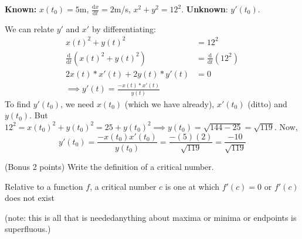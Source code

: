 \documentclass[11pt]{exam}
\renewcommand{\d}{\mathrm{d}}
\begin{document}
\begin{questions}
\textbf{Known:} $x(t_0)=5$m, $\frac{\d x}{\d t}=2$m/s, $x^2+y^2=12^2.$ \textbf{Unknown}: $y'(t_0)$.

We can relate $y'$ and $x'$ by differentiating: \begin{align*}
x(t)^2+y(t)^2&=12^2\\\frac{\d}{\d t}\left(x(t)^2+y(t)^2\right)&=\frac{\d}{\d t}\left(12^2\right)\\
2x(t)*x'(t)+2y(t)*y'(t)&=0\\
\implies y'(t)=\frac{-x(t)*x'(t)}{y(t)}
\end{align*}
To find $y'(t_0)$, we need $x(t_0)$ (which we have already), $x'(t_0)$ (ditto) and $y(t_0)$. But $12^2=x(t_0)^2+y(t_0)^2=25+y(t_0)^2\implies y(t_0)=\sqrt{144-25}=\sqrt{119}$. Now, $$y'(t_0)=\frac{-x(t_0)x'(t_0)}{y(t_0)}=\frac{-(5)(2)}{\sqrt{119}}=\frac{-10}{\sqrt{119}}$$


\question (Bonus 2 points) Write the definition of a critical number.

Relative to a function $f$, a critical number $c$ is one at which $f'(c)=0$ or $f'(c)$ does not exist

(note: this is all that is needed\textemdash anything about maxima or minima or endpoints is superfluous.)
\end{questions}
\end{document}
